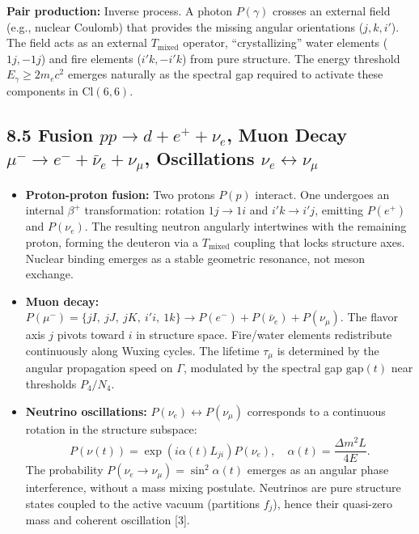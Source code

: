 \documentclass[11pt]{article}
\providecommand{\tightlist}{\setlength{\itemsep}{2pt}\setlength{\parskip}{6pt}}
\providecommand{\tightlist}{%
  \setlength{\itemsep}{2pt}\setlength{\parskip}{6pt}
}
\begin{document}
\textbf{Pair production:} Inverse process. A photon \(P(\gamma)\)
crosses an external field (e.g., nuclear Coulomb) that provides the
missing angular orientations (\(j, k, i'\)). The field acts as an
external \(T_{\text{mixed}}\) operator, ``crystallizing'' water elements
(\(1j, -1j\)) and fire elements (\(i'k, -i'k\)) from pure structure. The
energy threshold \(E_\gamma \geq 2m_e c^2\) emerges naturally as the
spectral gap required to activate these components in
\(\text{Cl}(6,6)\).

\hypertarget{fusion-pp-to-d-e-nu_e-muon-decay-mu--to-e--barnu_e-nu_mu-oscillations-nu_e-leftrightarrow-nu_mu}{%
\subsection{\texorpdfstring{8.5 Fusion \(pp \to d + e^+ + \nu_e\), Muon
Decay \(\mu^- \to e^- + \bar{\nu}_e + \nu_\mu\), Oscillations
\(\nu_e \leftrightarrow \nu_\mu\)}{8.5 Fusion pp \textbackslash to d + e\^{}+ + \textbackslash nu\_e, Muon Decay \textbackslash mu\^{}- \textbackslash to e\^{}- + \textbackslash bar\{\textbackslash nu\}\_e + \textbackslash nu\_\textbackslash mu, Oscillations \textbackslash nu\_e \textbackslash leftrightarrow \textbackslash nu\_\textbackslash mu}}\label{fusion-pp-to-d-e-nu_e-muon-decay-mu--to-e--barnu_e-nu_mu-oscillations-nu_e-leftrightarrow-nu_mu}}

\begin{itemize}
\tightlist
\item
  \textbf{Proton-proton fusion:} Two protons \(P(p)\) interact. One
  undergoes an internal \(\beta^+\) transformation: rotation
  \(1j \to 1i\) and \(i'k \to i'j\), emitting \(P(e^+)\) and
  \(P(\nu_e)\). The resulting neutron angularly intertwines with the
  remaining proton, forming the deuteron via a \(T_{\text{mixed}}\)
  coupling that locks structure axes. Nuclear binding emerges as a
  stable geometric resonance, not meson exchange.
\item
  \textbf{Muon decay:}
  \(P(\mu^-) = \{jI,\ jJ,\ jK,\ i'i,\ 1k\} \to P(e^-) + P(\bar{\nu}_e) + P(\nu_\mu)\).
  The flavor axis \(j\) pivots toward \(i\) in structure space.
  Fire/water elements redistribute continuously along Wuxing cycles. The
  lifetime \(\tau_\mu\) is determined by the angular propagation speed
  on \(\Gamma\), modulated by the spectral gap \(\text{gap}(t)\) near
  thresholds \(P_4/N_4\).
\item
  \textbf{Neutrino oscillations:}
  \(P(\nu_e) \leftrightarrow P(\nu_\mu)\) corresponds to a continuous
  rotation in the structure subspace: \[
  P(\nu(t)) = \exp(i \alpha(t) L_{ji}) P(\nu_e), \quad \alpha(t) = \frac{\Delta m^2 L}{4E}.
  \] The probability \(P(\nu_e \to \nu_\mu) = \sin^2 \alpha(t)\) emerges
  as an angular phase interference, without a mass mixing postulate.
  Neutrinos are pure structure states coupled to the active vacuum
  (partitions \(f_j\)), hence their quasi-zero mass and coherent
  oscillation {[}3{]}.
\end{itemize}
\end{document}
